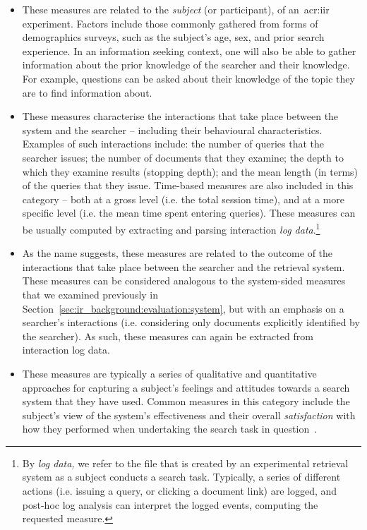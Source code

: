 \begin{itemize}
    \item{ These measures are related to the \emph{subject} (or participant), of an~\gls{acr:iir} experiment. Factors include those commonly gathered from forms of demographics surveys, such as the subject's age, sex, and prior search experience. In an information seeking context, one will also be able to gather information about the prior knowledge of the searcher and their knowledge. For example, questions can be asked about their knowledge of the topic they are to find information about.}
    
    \item{ These measures characterise the interactions that take place between the system and the searcher -- including their behavioural characteristics. Examples of such interactions include: the number of queries that the searcher issues; the number of documents that they examine; the depth to which they examine results (stopping depth); and the mean length (in terms) of the queries that they issue. Time-based measures are also included in this category -- both at a gross level (i.e. the total session time), and at a more specific level (i.e. the mean time spent entering queries). These measures can be usually computed by extracting and parsing interaction \emph{log data}.\footnote{By \emph{log data,} we refer to the file that is created by an experimental retrieval system as a subject conducts a search task. Typically, a series of different actions (i.e. issuing a query, or clicking a document link) are logged, and post-hoc log analysis can interpret the logged events, computing the requested measure.}}
    
    \item{ As the name suggests, these measures are related to the outcome of the interactions that take place between the searcher and the retrieval system. These measures can be considered analogous to the system-sided measures that we examined previously in Section~\ref{sec:ir_background:evaluation:system}, but with an emphasis on a searcher's interactions (i.e. considering only documents explicitly identified by the searcher). As such, these measures can again be extracted from interaction log data.}
    
    \item{ These measures are typically a series of qualitative and quantitative approaches for capturing a subject's feelings and attitudes towards a search system that they have used. Common measures in this category include the subject's view of the system's effectiveness and their overall \emph{satisfaction} with how they performed when undertaking the search task in question~\citep{hornbaek2006usability}.}
\end{itemize}

